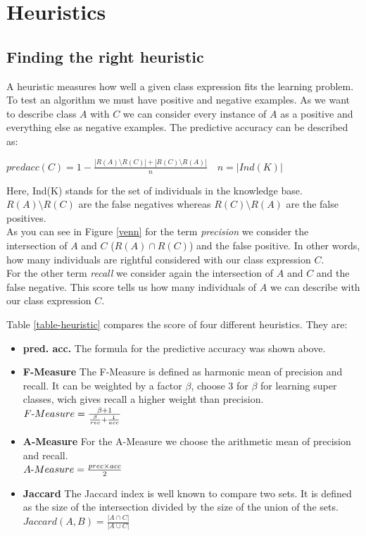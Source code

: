 \section{Heuristics}


\subsection{Finding the right heuristic}
A heuristic measures how well a given class expression fits the learning
problem. \cite{paper1}
To test an algorithm we must have positive and negative examples. As we want to
describe class $A$ with $C$ we can consider every instance of $A$ as a positive
and everything else as negative examples.
The predictive accuracy can be described as:\vspace{6pt}\\
\centerline{
$
predacc(C) = 1 - \frac{|R(A) \setminus R(C)| + |R(C) \setminus R(A)|}{n} \quad n
= |Ind(K)| $
}\vspace{6pt}
Here, Ind(K) stands for the set of individuals in the knowledge base. $R(A)
\setminus R(C)$ are the false negatives whereas $R(C) \setminus R(A)$ are the
false positives. \\
As you can see in Figure \ref{venn} for the term \emph{precision} we
consider the intersection of $A$ and $C$ ($R(A) \cap R(C)$) and the false
positive. In other words, how many individuals are rightful considered with our
class expression $C$.\\
For the other term \emph{recall} we consider again the intersection of $A$ and
$C$ and the false negative. This score tells us how many individuals of $A$ we
can describe with our class expression $C$.

Table \ref{table-heuristic} compares the score of four different heuristics.
They are:
\begin{itemize}
  \item{\textbf{pred. acc.}} The formula for the predictive accuracy was shown
  above.
  \item{\textbf{F-Measure}} The F-Measure is defined as harmonic mean of
  precision and recall. It can be weighted by a factor $\beta$, \cite{paper1} choose 3 for
  $\beta$ for learning super classes, wich gives recall a higher weight than
  precision.\\
  $F{\hbox{-}} Measure = \frac{\beta + 1}{\frac{\beta}{rec} +
  \frac{1}{acc}}$
  \item{\textbf{A-Measure}} For the A-Measure we choose the arithmetic mean of
  precision and recall.\\
  $A{\hbox{-}} Measure = \frac{prec \times acc }{2}$
  \item{\textbf{Jaccard}} The Jaccard index is well known to compare two sets.
  It is defined as the size of the intersection divided by the size of the union
  of the sets. $Jaccard(A,B) = \frac{|A \cap C|}{|A \cup C|}$
\end{itemize}



